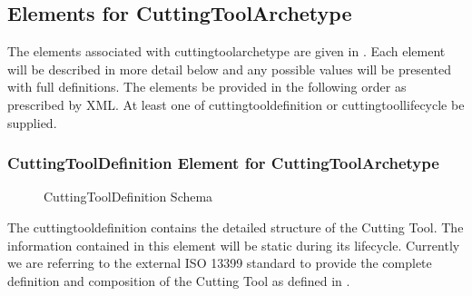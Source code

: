 \subsection{Elements for CuttingToolArchetype}

The elements associated with \gls{cuttingtoolarchetype} are given in .  Each element will be described in more detail below and any possible values will be presented with full definitions.  The elements \MUST be provided in the following order as prescribed by XML.  At least one of \gls{cuttingtooldefinition} or \gls{cuttingtoollifecycle} \MUST be supplied.



\pagebreak

\subsubsection{CuttingToolDefinition Element for CuttingToolArchetype}

\begin{figure}[ht]
  \centering
  \caption{CuttingToolDefinition Schema}
  \label{fig:cuttingtool-definition-schema}
\end{figure}

\FloatBarrier

The \gls{cuttingtooldefinition} contains the detailed structure of the Cutting Tool.  The information contained in this element will be static during its lifecycle.  Currently we are referring to the external ISO 13399 standard to provide the complete definition and composition of the Cutting Tool as defined in . 

